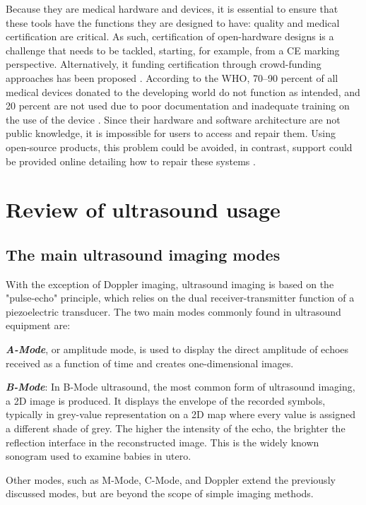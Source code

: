 \documentclass{article}
\begin{document}
Because they are medical hardware and devices, it is essential to ensure that these tools have the functions they are designed to have: quality and medical certification are critical. As such, certification of open-hardware designs is a challenge that needs to be tackled, starting, for example, from a CE marking perspective. Alternatively, it funding certification through crowd-funding approaches has been proposed \cite{de_maria_safe_2018}. According to the WHO, 70–90 percent of all medical devices donated to the developing world do not function as intended, and 20 percent are not used due to poor documentation and inadequate training on the use of the device \cite{niezen_open-source_2016}. Since their hardware and software architecture are not public knowledge, it is impossible for users to access and repair them. Using open-source products, this problem could be avoided, in contrast, support could be provided online detailing how to repair these systems \cite{gibney_open-hardware_2016}.

\section{Review of ultrasound usage}

\subsection{The main ultrasound imaging modes}

With the exception of Doppler imaging, ultrasound imaging is based on the "pulse-echo" principle, which relies on the dual receiver-transmitter function of a piezoelectric transducer. The two main modes commonly found in ultrasound equipment are:

\textbf{\textit{A-Mode}}, or amplitude mode, is used to display the direct amplitude of echoes received as a function of time and creates one-dimensional images.

\textbf{\textit{B-Mode}}: In B-Mode ultrasound, the most common form of ultrasound imaging, a 2D image is produced. It displays the envelope of the recorded symbols, typically in grey-value representation on a 2D map where every value is assigned a different shade of grey. The higher the intensity of the echo, the brighter the reflection interface in the reconstructed image. This is the widely known sonogram used to examine babies in utero.

Other modes, such as M-Mode, C-Mode, and Doppler  extend the previously discussed modes, but are beyond the scope of simple imaging methods.
\end{document}
